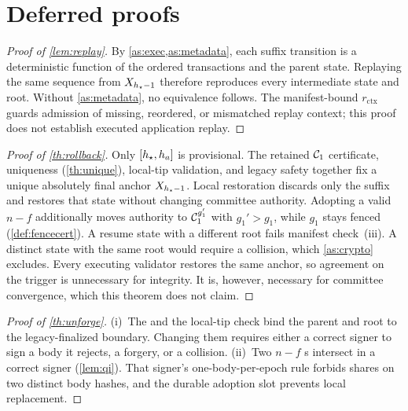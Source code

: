 \section{Deferred proofs}
\label{app:proofs}

\begin{proof}[Proof of \cref{lem:replay}]
By \cref{as:exec,as:metadata}, each suffix transition is a deterministic function of the ordered
transactions and the parent state. Replaying the same sequence from $X_{h_{\star}-1}$ therefore reproduces
every intermediate state and root. Without \cref{as:metadata}, no equivalence follows. The
manifest-bound $r_{\mathrm{ctx}}$ guards admission of missing, reordered, or mismatched replay
context; this proof does not establish executed application replay.
\end{proof}

\begin{proof}[Proof of \cref{th:rollback}]
Only $[h_{\star},h_a]$ is provisional. The retained $\mathcal{C}_1$ certificate, \CutCert{} uniqueness
(\cref{th:unique}), local-tip validation, and legacy safety together fix a unique absolutely final
anchor $X_{h_{\star}-1}$. Local restoration discards only the suffix and restores that state without
changing committee authority. Adopting a valid $n-f$ \AbortCert{} additionally moves authority to
$\mathcal{C}_1^{g_1'}$ with $g_1'>g_1$, while $g_1$ stays fenced (\cref{def:fencecert}). A resume state with a
different root fails manifest check~(iii). A distinct state with the same root would require a
collision, which \cref{as:crypto} excludes. Every executing validator restores the same anchor, so
agreement on the trigger is unnecessary for integrity. It is, however, necessary for committee
convergence, which this theorem does not claim.
\end{proof}

\begin{proof}[Proof of \cref{th:unforge}]
(i)~The \CutCert{} and the local-tip check bind the parent and root to the legacy-finalized boundary.
Changing them requires either a correct signer to sign a body it rejects, a forgery, or a collision.
(ii)~Two $n-f$ \ManCert{}s intersect in a correct signer (\cref{lem:qi}). That signer's
one-body-per-epoch rule forbids shares on two distinct body hashes, and the durable adoption slot
prevents local replacement.
\end{proof}

